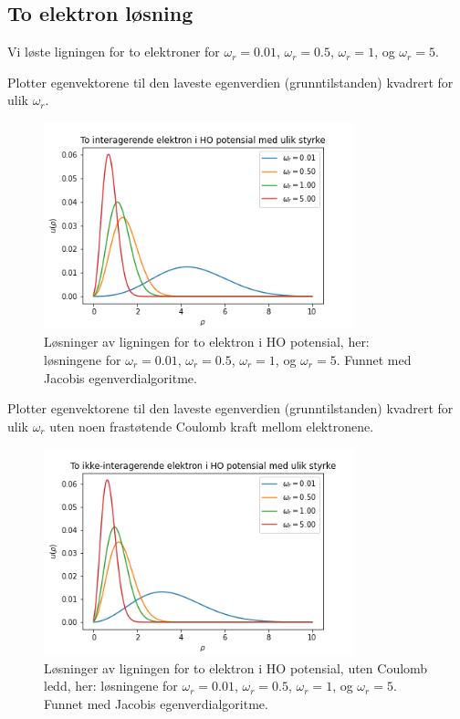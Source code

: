 \documentclass[reprint,english,notitlepage]{revtex4-1}
\begin{document}
\subsection{To elektron løsning}
	Vi løste ligningen for to elektroner for $\omega_r = 0.01$, $\omega_r = 0.5$, $\omega_r =1$,
	og $\omega_r = 5$.
	
	Plotter egenvektorene til den laveste egenverdien (grunntilstanden) kvadrert for ulik $\omega_r$. 
	\begin{figure}[H]
		\includegraphics[width=90mm]{../Figures/toElektron.png}
		\caption{Løsninger av ligningen for to elektron i HO potensial, her: løsningene for $\omega_r = 0.01$, $\omega_r = 0.5$, $\omega_r =1$, og $\omega_r = 5$. Funnet med Jacobis egenverdialgoritme.}
		\label{fig:toelektron}
	\end{figure}

	Plotter egenvektorene til den laveste egenverdien (grunntilstanden) kvadrert for ulik $\omega_r$ uten noen frastøtende Coulomb kraft mellom elektronene.
	\begin{figure}[H]
		\includegraphics[width=90mm]{../Figures/toElektronNoC.png}
		\caption{Løsninger av ligningen for to elektron i HO potensial, uten Coulomb ledd, her: løsningene for $\omega_r = 0.01$, $\omega_r = 0.5$, $\omega_r =1$, og $\omega_r = 5$. Funnet med Jacobis egenverdialgoritme.}
		\label{fig:toelektronnoC}
	\end{figure}
	
\end{document}
